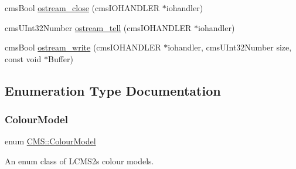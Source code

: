 \begin{DoxyCompactItemize}
\item 
cms\+Bool \hyperlink{namespace_c_m_s_a57d6234e6fb36cc71bcae4a825ad3ba0}{ostream\+\_\+close} (cms\+I\+O\+H\+A\+N\+D\+L\+ER $\ast$iohandler)
\item 
cms\+U\+Int32\+Number \hyperlink{namespace_c_m_s_a4420e9cff988db0418ae3a9c76ec5f9e}{ostream\+\_\+tell} (cms\+I\+O\+H\+A\+N\+D\+L\+ER $\ast$iohandler)
\item 
cms\+Bool \hyperlink{namespace_c_m_s_ac6a6e80213301c0cbce0fcd8a98e6108}{ostream\+\_\+write} (cms\+I\+O\+H\+A\+N\+D\+L\+ER $\ast$iohandler, cms\+U\+Int32\+Number size, const void $\ast$Buffer)
\end{DoxyCompactItemize}


\subsection{Enumeration Type Documentation}
\mbox{\label{namespace_c_m_s_a9cb18b5da51a22c3c9dd25a5c9048e42}} 
\subsubsection{\texorpdfstring{Colour\+Model}{ColourModel}}
{\footnotesize\ttfamily enum \hyperlink{namespace_c_m_s_a9cb18b5da51a22c3c9dd25a5c9048e42}{C\+M\+S\+::\+Colour\+Model}\hspace{0.3cm}{\ttfamily [strong]}}



An enum class of L\+C\+M\+S2\textquotesingle{}s colour models. 

